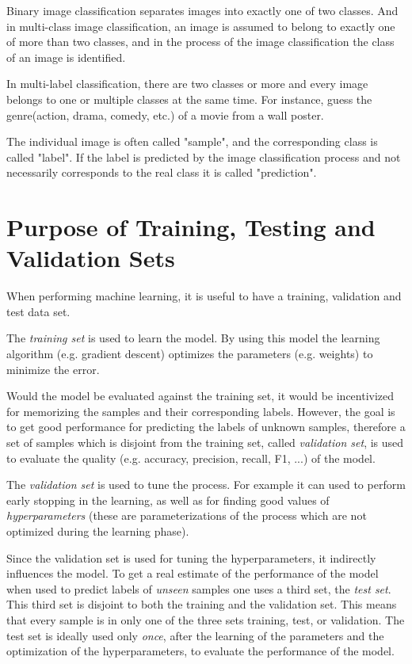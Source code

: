 \documentclass[sigconf,nonacm]{acmart}
\begin{document}
Binary image classification separates images into exactly one of two classes. And in multi-class image classification, an image is assumed to belong to exactly one of more than two classes, and
in the process of the image classification the class of an image
is identified.

In multi-label classification, there are two classes or more and every image belongs to one or multiple classes at the same time. For instance, guess the genre(action, drama, comedy, etc.) of a movie from a wall poster.

The individual image is often called "sample", and the corresponding
class is called "label".
If the label is predicted by the image classification process
and not necessarily corresponds to the real class it is
called "prediction".

\section{Purpose of Training, Testing and Validation Sets}

When performing machine learning, it is useful to have a training,
validation and test data set.

The \emph{training set} is used to learn the model. By using this model
the learning algorithm (e.g. gradient descent) optimizes the parameters
(e.g. weights) to minimize the error.

Would the model be evaluated against the training set, it would be
incentivized for memorizing the samples and their corresponding labels.
However, the goal is to get good performance for predicting
the labels of unknown samples, therefore a set of samples which is
disjoint from the training set, called \emph{validation set}, is used to
evaluate the quality (e.g. accuracy, precision, recall, F1, ...)
of the model.

The \emph{validation set} is used to tune the process. For example it can used
to perform early stopping in the learning, as well as for finding good
values of \emph{hyperparameters} (these are parameterizations of the process
which are not optimized during the learning phase).

Since the validation set is used for tuning the hyperparameters, it
indirectly influences the model.
To get a real estimate of the performance of the model when used to
predict labels of \emph{unseen} samples one uses a third set, the
\emph{test set}.
This third set is disjoint to both the training and the validation set.
This means that every sample is in only one of the three sets
training, test, or validation.
The test set is ideally used only \emph{once}, after the learning
of the parameters
and the optimization of the hyperparameters, to evaluate the performance
of the model.
\end{document}
